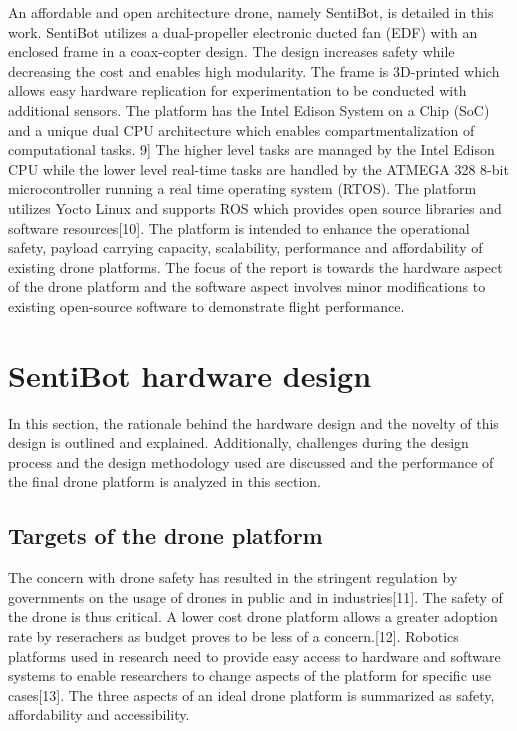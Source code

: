 \documentclass[12pt]{article}
\begin{document}
An affordable and open architecture drone, namely SentiBot, is detailed in this work. SentiBot utilizes a dual-propeller electronic ducted fan (EDF) with an enclosed frame in a coax-copter design. The design increases safety while decreasing the cost and enables high modularity. The frame is 3D-printed which allows easy hardware replication for experimentation to be conducted with additional sensors. The platform has the Intel Edison System on a Chip (SoC) and a unique dual CPU architecture which enables compartmentalization of computational tasks. 9] The higher level tasks are managed by the Intel Edison CPU while the lower level real-time tasks are handled by the ATMEGA 328 8-bit microcontroller running a real time operating system (RTOS). The platform utilizes Yocto Linux and supports ROS which provides open source libraries and software resources[10]. The platform is intended to enhance the operational safety, payload carrying capacity, scalability, performance and affordability of existing drone platforms. The focus of the report is towards the hardware aspect of the drone platform and the software aspect involves minor modifications to existing open-source software to demonstrate flight performance.

\section{SentiBot hardware design}

In this section, the rationale behind the hardware design and the novelty of this design is outlined and explained. Additionally, challenges during the design process and the design methodology used are discussed and the performance of the final drone platform is analyzed in this section.

\subsection{Targets of the drone platform}

The concern with drone safety has resulted in the stringent regulation by governments on the usage of drones in public and in industries[11]. The safety of the drone is thus critical. A lower cost drone platform allows a greater adoption rate by reserachers as budget proves to be less of a concern.[12]. Robotics platforms used in research need to provide easy access to hardware and software systems to enable researchers to change aspects of the platform for specific use cases[13]. The three aspects of an ideal drone platform is summarized as safety, affordability and accessibility. 
\end{document}
